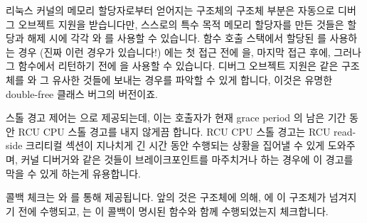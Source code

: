 리눅스 커널의 메모리 할당자로부터 얻어지는 구조체의  구조체 부분은
자동으로 디버그 오브젝트 지원을 받습니다만, 스스로의 특수 목적 메모리 할당자를
만든 것들은 할당과 해제 시에 각각  와
 를 사용할 수 있습니다.
함수 호출 스택에서 할당된  를 사용하는 경우 (진짜 이런 경우가
있습니다!) 에는 첫 접근 전에  을, 마지막 접근
후에, 그러나 그 함수에서 리턴하기 전에  을
사용할 수 있습니다.
디버그 오브젝트 지원은 같은  구조체를  와 그 유사한
것들에 보내는 경우를 파악할 수 있게 합니다, 이것은 유명한 double-free 클래스
버그의  버전이죠.

스톨 경고 제어는  으로 제공되는데, 이는 호출자가 현재
grace period 의 남은 기간 동안 RCU CPU 스톨 경고를 내지 않게끔 합니다.
RCU CPU 스톨 경고는 RCU read-side 크리티컬 섹션이 지나치게 긴 시간 동안
수행되는 상황을 집어낼 수 있게 도와주며, 커널 디버거와 같은 것들이
브레이크포인트를 마주치거나 하는 경우에 이 경고를 막을 수 있게 하는게
유용합니다.

콜백 체크는  와  를 통해
제공됩니다.
앞의 것은  구조체에 의해,  에 이 구조체가 넘겨지기
전에 수행되고,  는 이 콜백이 명시된 함수와 함께
수행되었는지 체크합니다.
\iffalse

